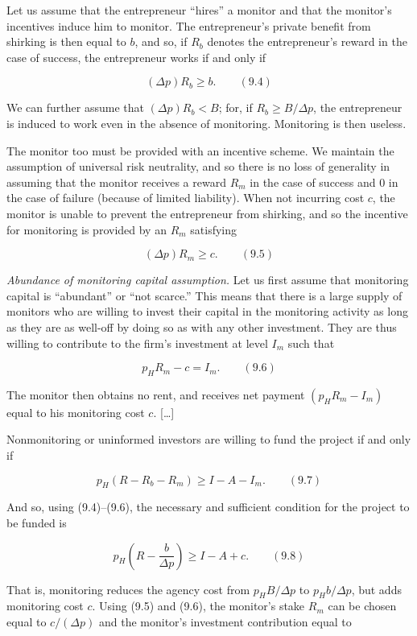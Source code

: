 \documentclass[11pt,a4paper]{article}
\begin{document}
Let us assume that the entrepreneur ``hires'' a monitor and that the monitor's incentives induce him
to monitor. The entrepreneur's private benefit from shirking is then equal to \(b\), and so, if
\(R_b\) denotes the entrepreneur's reward in the case of success, the entrepreneur works if and only
if

\[(\Delta p)R_b \geqslant b. \qquad (9.4)\]

We can further assume that \((\Delta p)R_b < B\); for, if \(R_b \geqslant B/\Delta p\), the
entrepreneur is induced to work even in the absence of monitoring. Monitoring is then useless.

The monitor too must be provided with an incentive scheme. We maintain the assumption of universal
risk neutrality, and so there is no loss of generality in assuming that the monitor receives a
reward \(R_m\) in the case of success and 0 in the case of failure (because of limited liability).
When not incurring cost \(c\), the monitor is unable to prevent the entrepreneur from shirking, and
so the incentive for monitoring is provided by an \(R_m\) satisfying

\[(\Delta p)R_m \geqslant c. \qquad (9.5)\]

\emph{Abundance of monitoring capital assumption.} Let us first assume that monitoring capital is
``abundant'' or ``not scarce.'' This means that there is a large supply of monitors who are willing
to invest their capital in the monitoring activity as long as they are as well-off by doing so as
with any other investment. They are thus willing to contribute to the firm's investment at level
\(I_m\) such that

\[p_H R_m - c = I_m. \qquad (9.6)\]

The monitor then obtains no rent, and receives net payment \((p_H R_m - I_m)\) equal to his
monitoring cost \(c\). {[}\ldots{]}

Nonmonitoring or uninformed investors are willing to fund the project if and only if

\[p_H(R - R_b - R_m) \geqslant I - A - I_m. \qquad (9.7)\]

And so, using (9.4)--(9.6), the necessary and sufficient condition for the project to be funded is

\[p_H\left(R - \frac{b}{\Delta p}\right) \geqslant I - A + c. \qquad (9.8)\]

That is, monitoring reduces the agency cost from \(p_H B/\Delta p\) to \(p_H b/\Delta p\), but adds
monitoring cost \(c\). Using (9.5) and (9.6), the monitor's stake \(R_m\) can be chosen equal to
\(c/(\Delta p)\) and the monitor's investment contribution equal to
\end{document}
